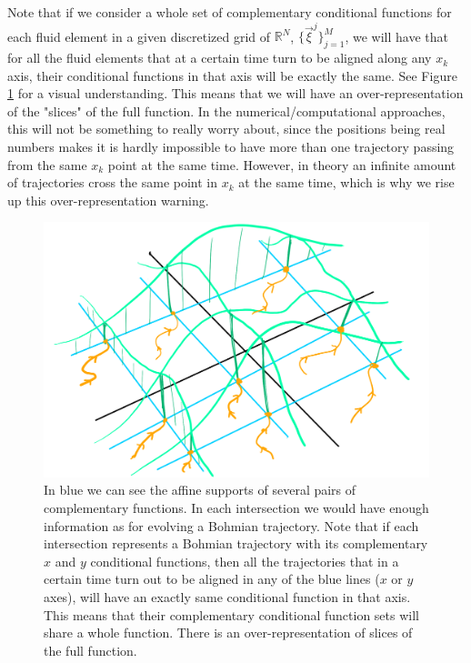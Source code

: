 \documentclass[11pt, a4paper]{article} %
\newcommand{\R}{\mathbb{R}} %
\begin{document}
Note that if we consider a whole set of complementary conditional functions for each fluid element in a given discretized grid of $\R^N$, $\{\vec{\xi}^j\}_{j=1}^M$, we will have that for all the fluid elements that at a certain time turn to be aligned along any $x_k$ axis, their conditional functions in that axis will be exactly the same. See Figure \ref{fig:over} for a visual understanding. This means that we will have an over-representation of the "slices" of the full function. In the numerical/computational approaches, this will not be something to really worry about, since the positions being real numbers makes it is hardly impossible to have more than one trajectory passing from the same $x_k$ point at the same time. However, in theory an infinite amount of trajectories cross the same point in $x_k$ at the same time, which is why we rise up this over-representation warning.\vspace{0.5cm}

\begin{figure}[h!]
  \centering
    \includegraphics[width=0.65\linewidth]{many_bohmian.png}
  \caption{In blue we can see the affine supports of several pairs of complementary functions. In each intersection we would have enough information as for evolving a Bohmian trajectory. Note that if each intersection represents a Bohmian trajectory with its complementary $x$ and $y$ conditional functions, then all the trajectories that in a certain time turn out to be aligned in any of the blue lines ($x$ or $y$ axes), will have an exactly same conditional function in that axis. This means that their complementary conditional function sets will share a whole function. There is an over-representation of slices of the full function. }
  \label{fig:over}
\end{figure}
\newpage
\end{document}
